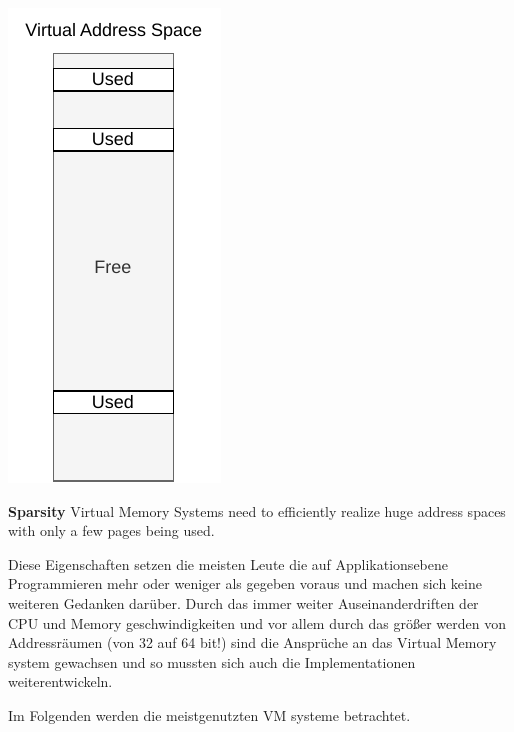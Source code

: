 \begin{marginfigure}
    \includegraphics*[width=0.5\marginparwidth]{figures/fund_sparsity.pdf}
    \caption{\textbf{Sparsity} Virtual Memory Systems need to efficiently
        realize huge address spaces with only a few pages being used.}
\end{marginfigure}





Diese Eigenschaften setzen die meisten Leute die auf Applikationsebene Programmieren mehr oder
weniger als gegeben voraus und machen sich keine weiteren Gedanken darüber.
Durch das immer weiter Auseinanderdriften der CPU und Memory geschwindigkeiten und vor allem
durch das größer werden von Addressräumen (von 32 auf 64 bit!)  sind die Ansprüche an
das Virtual Memory system gewachsen und so mussten sich auch die Implementationen weiterentwickeln.

Im Folgenden werden die meistgenutzten VM systeme betrachtet.

